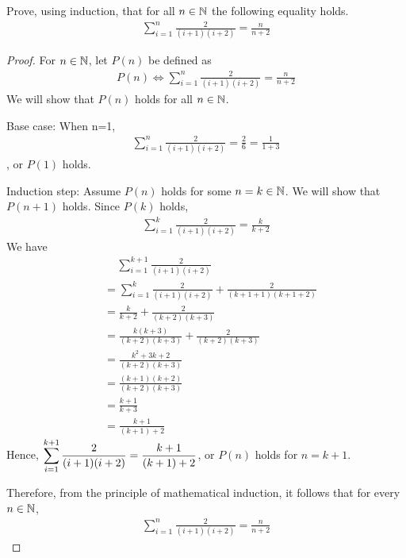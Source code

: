\begin{question}
    \normalfont
    Prove, using induction, that for all $n\in\mathbb N$ the following equality holds.
    \[
        \begin{aligned}
            \sum_{i=1}^{n}\frac{2}{(i+1)(i+2)}=\frac{n}{n+2}
        \end{aligned}
    \]
\end{question}

\begin{proof}
    \renewcommand{\qedsymbol}{$\blacksquare$}
    For $n\in\mathbb N$, let $P(n)$ be defined as 
    \[
        \begin{aligned}
            P(n)\iff \sum_{i=1}^{n}\frac{2}{(i+1)(i+2)}=\frac{n}{n+2}
        \end{aligned}
    \]
    We will show that $P(n)$ holds for all $n\in\mathbb N$.

    Base case: When n=1, 
    \[
        \begin{aligned}
            \sum_{i=1}^{n}\frac{2}{(i+1)(i+2)}=\frac{2}{6}=\frac{1}{1+3}
        \end{aligned}
    \]
    , or $P(1)$ holds.

    Induction step: Assume $P(n)$ holds for some $n=k\in\mathbb N$. We will show that $P(n+1)$ holds.
    Since $P(k)$ holds, 
    \[
        \begin{aligned}
            \sum_{i=1}^{k}\frac{2}{(i+1)(i+2)}=\frac{k}{k+2}
        \end{aligned}
    \]
    We have 
    \[
        \begin{aligned}
            &\quad\, \sum_{i=1}^{k+1}\frac{2}{(i+1)(i+2)}\\
            &= \sum_{i=1}^{k}\frac{2}{(i+1)(i+2)}+\frac{2}{(k+1+1)(k+1+2)}\\
            &= \frac{k}{k+2}+\frac{2}{(k+2)(k+3)}\\
            &= \frac{k(k+3)}{(k+2)(k+3)}+\frac{2}{(k+2)(k+3)}\\
            &= \frac{k^2+3k+2}{(k+2)(k+3)}\\
            &= \frac{(k+1)(k+2)}{(k+2)(k+3)}\\
            &= \frac{k+1}{k+3}\\
            &= \frac{k+1}{(k+1)+2}
        \end{aligned}
    \]
    Hence, $\mathlarger{\sum_{i=1}^{k+1}\frac{2}{(i+1)(i+2)}=\frac{k+1}{(k+1)+2}}$, or $P(n)$ holds for $n=k+1$.
    
    Therefore, from the principle of mathematical induction, it follows that for every $n\in\mathbb N$, 
    \[
        \begin{aligned}
            \sum_{i=1}^{n}\frac{2}{(i+1)(i+2)}=\frac{n}{n+2}
        \end{aligned}
    \]
\end{proof}